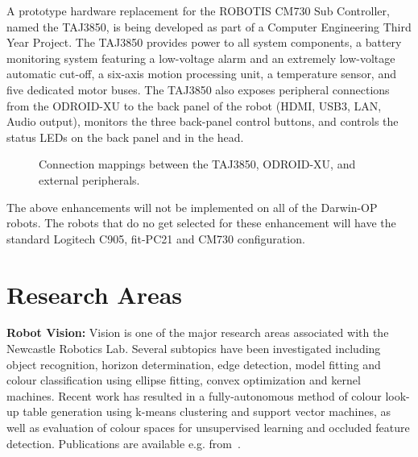 \documentclass{llncs}
\begin{document}
A prototype hardware replacement for the ROBOTIS CM730 Sub Controller, named the TAJ3850, is 
being developed as part of a Computer Engineering Third Year Project. The TAJ3850 provides power to all system components, a battery monitoring system featuring a low-voltage alarm and an extremely low-voltage automatic cut-off, a six-axis motion processing unit, a temperature sensor, and five dedicated motor buses. The TAJ3850 also exposes peripheral connections from the ODROID-XU to the back panel of the robot (HDMI, USB3, LAN, Audio output), monitors the three back-panel control buttons, and controls the status LEDs on the back panel and in the head.

\begin{figure}
\begin{center}
\caption{Connection mappings between the TAJ3850, ODROID-XU, and external peripherals.}
\label{fig:taj3850}
\end{center}
\end{figure}


The above enhancements will not be implemented on all of the Darwin-OP robots. The robots that do no get selected for these enhancement will have the standard Logitech C905, fit-PC21 and CM730 configuration.

\section{Research Areas}

\noindent\textbf{Robot Vision:} Vision is one of the major research areas associated with the Newcastle Robotics Lab. Several subtopics have been investigated including object recognition, horizon determination, edge detection, model fitting and colour classification using ellipse fitting, convex optimization and kernel machines. Recent work has resulted in a fully-autonomous method of colour look-up table generation using k-means clustering and support vector machines, as well as evaluation of colour spaces for unsupervised learning and occluded feature detection. Publications are available e.g. from~\cite{budden2012colour,budden2012ball,henderson_2007,nickin_2007,NUBOT2006,Henderson2008}.
\\
\end{document}
